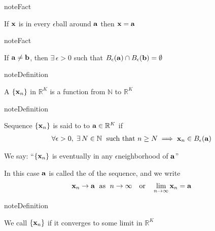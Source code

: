 \documentclass[letterpaper,10pt,english]{jupyterBook}
\begin{document}
\begin{figure}[htbp]
\centering

\noindent{}
\end{figure}

\begin{sphinxadmonition}{note}{Fact}

\sphinxAtStartPar
If \({\bf x}\) is in every \(\epsilon\)\sphinxhyphen{}ball around \({\bf a}\) then
\({\bf x}={\bf a}\)
\end{sphinxadmonition}

\begin{sphinxadmonition}{note}{Fact}

\sphinxAtStartPar
If \({\bf a} \ne {\bf b}\), then \(\exists \, \epsilon > 0\) such that
\(B_\epsilon({\bf a}) \cap B_\epsilon({\bf b}) = \emptyset\)
\end{sphinxadmonition}

\begin{sphinxadmonition}{note}{Definition}

\sphinxAtStartPar
A  \(\{{\bf x}_n\}\) in \(\mathbb{R}^K\) is a function from \(\mathbb{N}\) to \(\mathbb{R}^K\)
\end{sphinxadmonition}

\begin{sphinxadmonition}{note}{Definition}

\sphinxAtStartPar
Sequence \(\{{\bf x}_n\}\) is said to  to \({\bf a} \in \mathbb{R}^K\) if
\begin{equation*}
\begin{split}
\forall \epsilon > 0, 
\;
\exists \, N \in \mathbb{N}
\; 
\text{ such that }  n \geq N \implies {\bf x}_n \in B_{\epsilon}({\bf a})
\end{split}
\end{equation*}\end{sphinxadmonition}

\sphinxAtStartPar
We say: “\(\{{\bf x}_n\}\) is eventually in any \(\epsilon\)\sphinxhyphen{}neighborhood of \({\bf a}\)”

\sphinxAtStartPar
In this case \({\bf a}\) is called the  of the sequence, and we write
\begin{equation*}
\begin{split} 
{\bf x}_n \to {\bf a} \; \text{ as } \; n \to \infty
\quad \text{or} \quad
\lim_{n \to \infty} {\bf x}_n = {\bf a}
\end{split}
\end{equation*}
\begin{sphinxadmonition}{note}{Definition}

\sphinxAtStartPar
We call \(\{ {\bf x}_n \}\)  if it converges to some limit in \(\mathbb{R}^K\)
\end{sphinxadmonition}
\end{document}

